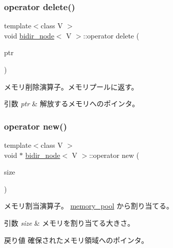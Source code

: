 \subsubsection{\texorpdfstring{operator delete()}{operator delete()}}
{\footnotesize\ttfamily template$<$class V $>$ \\
void \hyperlink{classbidir__node}{bidir\+\_\+node}$<$ V $>$\+::operator delete (\begin{DoxyParamCaption}\item[{void $\ast$}]{ptr }\end{DoxyParamCaption})\hspace{0.3cm}{\ttfamily [static]}}

メモリ削除演算子。メモリプールに返す。 
\begin{DoxyParams}{引数}
{\em ptr} & 解放するメモリへのポインタ。 \\
\hline
\end{DoxyParams}
\hypertarget{classbidir__node_aec71c6df26420dff2ffdf5a43f8b613e}{}\label{classbidir__node_aec71c6df26420dff2ffdf5a43f8b613e} 
\subsubsection{\texorpdfstring{operator new()}{operator new()}}
{\footnotesize\ttfamily template$<$class V $>$ \\
void $\ast$ \hyperlink{classbidir__node}{bidir\+\_\+node}$<$ V $>$\+::operator new (\begin{DoxyParamCaption}\item[{size\+\_\+t}]{size }\end{DoxyParamCaption})\hspace{0.3cm}{\ttfamily [static]}}

メモリ割当演算子。 \hyperlink{classmemory__pool}{memory\+\_\+pool} から割り当てる。 
\begin{DoxyParams}{引数}
{\em size} & メモリを割り当てる大きさ。 \\
\hline
\end{DoxyParams}
\begin{DoxyReturn}{戻り値}
確保されたメモリ領域へのポインタ。 
\end{DoxyReturn}
\hypertarget{classbidir__node_a4e0e59b16c9f182cb917e821b42e9c35}{}\label{classbidir__node_a4e0e59b16c9f182cb917e821b42e9c35} 
